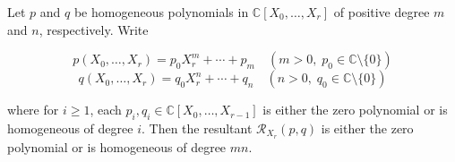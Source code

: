 Let $p$ and $q$ be homogeneous polynomials in $\mathbb{C}[X_0, \ldots, X_r]$ of positive degree $m$ and $n$, respectively. Write

$$
p(X_0, \ldots, X_r) = p_0 X_r^m + \cdots + p_m \quad (m > 0,\; p_0 \in \mathbb{C} \setminus \{0\})
$$
$$
q(X_0, \ldots, X_r) = q_0 X_r^n + \cdots + q_n \quad (n > 0,\; q_0 \in \mathbb{C} \setminus \{0\})
$$

where for $i \geqslant 1$, each $p_i, q_i \in \mathbb{C}[X_0, \ldots, X_{r-1}]$ is either the zero polynomial or is homogeneous of degree $i$. Then the resultant $\mathcal{R}_{X_r}(p, q)$ is either the zero polynomial or is homogeneous of degree $mn$.
